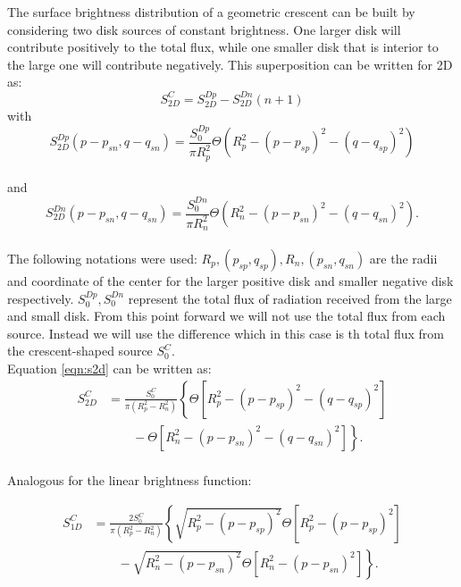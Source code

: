 The surface brightness distribution of a geometric crescent can be built by considering two disk sources of constant brightness. One larger disk will contribute positively to the total flux, while one smaller disk 
that is interior to the large one will contribute negatively. This superposition can be written for 2D as:\\

\begin{equation}
 S_{2D}^C =  S_{2D}^{Dp} -  S_{2D}^{Dn}   (n+1)
 \label{eqn:s2d}
\end{equation}
with\\

\begin{equation}
 S_{2D}^{Dp}(p-p_{sn}, q-q_{sn}) = \frac{S_0^{Dp}}{\pi R_p^2} \Theta \left( R_p^2 - \left( p-p_{sp} \right)^2 - \left( q-q_{sp} \right)^2 \right)
\end{equation}
\\
and
\begin{equation}
 S_{2D}^{Dn}(p-p_{sn}, q-q_{sn}) = \frac{S_0^{Dn}}{\pi R_n^2} \Theta \left( R_n^2 - \left( p-p_{sn} \right)^2 - \left( q-q_{sn} \right)^2 \right).
\end{equation}
\\
The following notations were used: $R_p, (p_{sp}, q_{sp}), R_n, (p_{sn},q_{sn})$ are the radii and coordinate of the center for the larger positive disk and smaller negative disk respectively.  $S_0^{Dp},S_0^{Dn}$ represent the total flux of radiation received from the large and small disk. From this point forward we will not use the total flux from each source. Instead we will 
use the difference which in this case is th total flux from the crescent-shaped source $S_0^C$. \\
Equation \ref{eqn:s2d} can be written as:\\

\begin{align}
 S_{2D}^C &= \frac{S_0^C}{\pi \left(R_p^2-R_n^2 \right)} \left\{ \Theta \left[ R_p^2 - \left( p-p_{sp} \right)^2 - \left( q-q_{sp} \right)^2 \right] \right.\nonumber\\
 &\qquad \left. {} -  \Theta \left[ R_n^2 - \left( p-p_{sn} \right)^2 - \left( q-q_{sn} \right)^2 \right] \right\}.
\end{align}
\\
Analogous for the linear brightness function:

\begin{align}
 S_{1D}^C &= \frac{2 S_0^C}{\pi \left(R_p^2-R_n^2 \right)} \left\{ \sqrt{R_p^2 - (p-p_{sp})^2}  \Theta \left[ R_p^2 - \left( p-p_{sp} \right)^2 \right] \right.\nonumber\\
 &\qquad \left. {} - \sqrt{R_n^2 - (p-p_{sn})^2 } \Theta \left[ R_n^2 - \left( p-p_{sn} \right)^2 \right] \right\}.
\label{eqn:s1_d}
\end{align}



